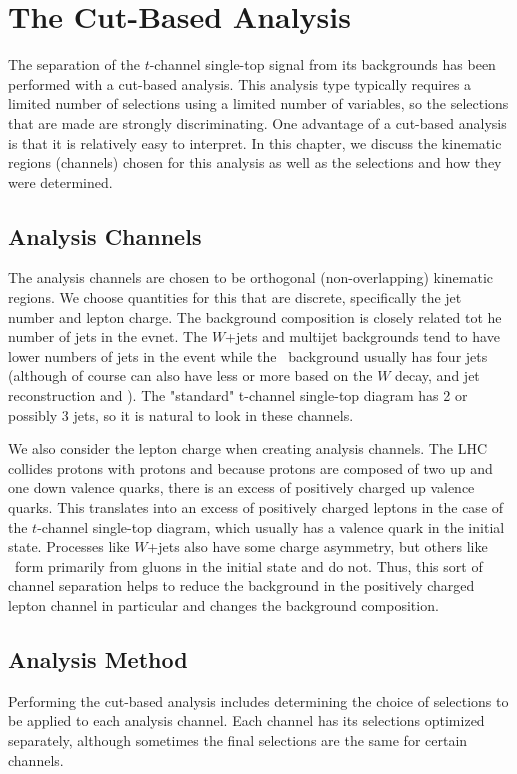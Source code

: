 \chapter{The Cut-Based Analysis}
The separation of the $t$-channel single-top signal from its backgrounds has been performed with a cut-based analysis.  This analysis type typically requires a limited number of selections using a limited number of variables, so the selections that are made are strongly discriminating.  One advantage of a cut-based analysis is that it is relatively easy to interpret.  In this chapter, we discuss the kinematic regions (channels) chosen for this analysis as well as the selections and how they were determined.

\section{Analysis Channels}\label{sec:channels}
The analysis channels are chosen to be orthogonal (non-overlapping) kinematic regions.  We choose quantities for this that are discrete, specifically the jet number and lepton charge.  The background composition is closely related tot he number of jets in the evnet.  The $W$+jets and multijet backgrounds tend to have lower numbers of jets in the event while the \ttbar~background usually has four jets (although of course can also have less or more based on the $W$ decay, and jet reconstruction and \pt).  The "standard" t-channel single-top diagram has 2 or possibly 3 jets, so it is natural to look in these channels.  

We also consider the lepton charge when creating analysis channels.  The LHC collides protons with protons and because protons are composed of two up and one down valence quarks, there is an excess of positively charged up valence quarks.  This translates into an excess of positively charged leptons in the case of the $t$-channel single-top diagram, which usually has a valence quark in the initial state.  Processes like $W$+jets also have some charge asymmetry, but others like \ttbar~form primarily from gluons in the initial state and do not.  Thus, this sort of channel separation helps to reduce the background in the positively charged lepton channel in particular and changes the background composition.

\section{Analysis Method}
Performing the cut-based analysis includes determining the choice of selections to be applied to each analysis channel.  Each channel has its selections optimized separately, although sometimes the final selections are the same for certain channels.

